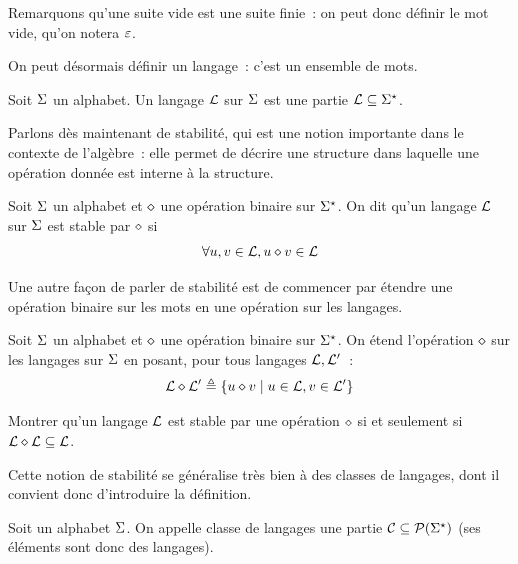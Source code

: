 Remarquons qu'une suite vide est une suite finie~: on peut donc définir le mot
vide, qu'on notera $\Ewd$.
\index[notation]{$\Ewd$}

On peut désormais définir un langage~: c'est un ensemble de mots.

\begin{definition}[Langage]
  Soit $\Sigma$ un alphabet. Un langage $\mathcal L$ sur $\Sigma$ est une partie
  $\mathcal L\subseteq\Sigma^{\star}$.
\end{definition}

Parlons dès maintenant de stabilité, qui est une notion importante dans le
contexte de l'algèbre~: elle permet de décrire une structure dans laquelle
une opération donnée est interne à la structure.

\begin{definition}[Stabilité]
  Soit $\Sigma$ un alphabet et $\mathbin{\diamond}$ une opération binaire sur $\Sigma^{\star}$. On
  dit qu'un langage $\mathcal L$ sur $\Sigma$ est stable par $\mathbin{\diamond}$ si
  \[\forall u,v\in \mathcal L, u\mathbin{\diamond} v \in \mathcal L\]
\end{definition}

Une autre façon de parler de stabilité est de commencer par étendre une
opération binaire sur les mots en une opération sur les langages.

\begin{definition}
  Soit $\Sigma$ un alphabet et $\mathbin{\diamond}$ une opération binaire sur $\Sigma^{\star}$. On
  étend l'opération $\mathbin{\diamond}$ sur les langages sur $\Sigma$ en posant, pour tous
  langages $\mathcal L,\mathcal L'$~:
  \[\mathcal L\mathbin{\diamond} \mathcal L' \triangleq
  \left\{ u\mathbin{\diamond}v \;\middle\vert\; u \in \mathcal L, v \in \mathcal L' \right\}\]
\end{definition}

\begin{exercise}
  Montrer qu'un langage $\mathcal L$ est stable par une opération $\mathbin{\diamond}$ si et
  seulement si $\mathcal L \mathbin{\diamond} \mathcal L \subseteq \mathcal L$.
\end{exercise}

Cette notion de stabilité se généralise très bien à des classes de langages,
dont il convient donc d'introduire la définition.

\begin{definition}
  Soit un alphabet $\Sigma$. On appelle classe de langages une partie
  $\mathcal{C}\subseteq \mathcal{P}(\Sigma^{\star})$ (ses éléments sont donc des langages).
\end{definition}

